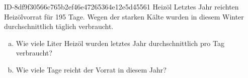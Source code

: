 \begin{exercise}
      {ID-8df9f30566c765b2ef46e47265364e12e5d45561}
      {Heizöl}
  \ifproblem\problem
    Letztes Jahr reichten  Heizölvorrat für \num{195} Tage. Wegen der starken
    Kälte wurden in diesem Winter durchschnittlich  täglich verbraucht.
    \begin{enumerate}[a)]
      \item Wie viele Liter Heizöl wurden letztes Jahr durchschnittlich
            pro Tag verbraucht?
      \item Wie viele Tage reicht der Vorrat in diesem Jahr?
    \end{enumerate}
  \fi
\end{exercise}
